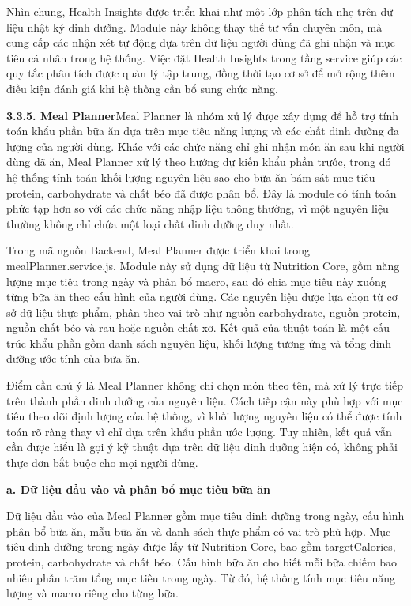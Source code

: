 Nhìn chung, Health Insights được triển khai như một lớp phân tích nhẹ trên dữ liệu nhật ký dinh dưỡng. Module này không thay thế tư vấn chuyên môn, mà cung cấp các nhận xét tự động dựa trên dữ liệu người dùng đã ghi nhận và mục tiêu cá nhân trong hệ thống. Việc đặt Health Insights trong tầng service giúp các quy tắc phân tích được quản lý tập trung, đồng thời tạo cơ sở để mở rộng thêm điều kiện đánh giá khi hệ thống cần bổ sung chức năng.

\textbf{3.3.5. Meal Planner}Meal Planner là nhóm xử lý được xây dựng để hỗ trợ tính toán khẩu phần bữa ăn dựa trên mục tiêu năng lượng và các chất dinh dưỡng đa lượng của người dùng. Khác với các chức năng chỉ ghi nhận món ăn sau khi người dùng đã ăn, Meal Planner xử lý theo hướng dự kiến khẩu phần trước, trong đó hệ thống tính toán khối lượng nguyên liệu sao cho bữa ăn bám sát mục tiêu protein, carbohydrate và chất béo đã được phân bổ. Đây là module có tính toán phức tạp hơn so với các chức năng nhập liệu thông thường, vì một nguyên liệu thường không chỉ chứa một loại chất dinh dưỡng duy nhất.

Trong mã nguồn Backend, Meal Planner được triển khai trong mealPlanner.service.js. Module này sử dụng dữ liệu từ Nutrition Core, gồm năng lượng mục tiêu trong ngày và phân bổ macro, sau đó chia mục tiêu này xuống từng bữa ăn theo cấu hình của người dùng. Các nguyên liệu được lựa chọn từ cơ sở dữ liệu thực phẩm, phân theo vai trò như nguồn carbohydrate, nguồn protein, nguồn chất béo và rau hoặc nguồn chất xơ. Kết quả của thuật toán là một cấu trúc khẩu phần gồm danh sách nguyên liệu, khối lượng tương ứng và tổng dinh dưỡng ước tính của bữa ăn.

Điểm cần chú ý là Meal Planner không chỉ chọn món theo tên, mà xử lý trực tiếp trên thành phần dinh dưỡng của nguyên liệu. Cách tiếp cận này phù hợp với mục tiêu theo dõi định lượng của hệ thống, vì khối lượng nguyên liệu có thể được tính toán rõ ràng thay vì chỉ dựa trên khẩu phần ước lượng. Tuy nhiên, kết quả vẫn cần được hiểu là gợi ý kỹ thuật dựa trên dữ liệu dinh dưỡng hiện có, không phải thực đơn bắt buộc cho mọi người dùng.

\textbf{a. Dữ liệu đầu vào và phân bổ mục tiêu bữa ăn}

Dữ liệu đầu vào của Meal Planner gồm mục tiêu dinh dưỡng trong ngày, cấu hình phân bổ bữa ăn, mẫu bữa ăn và danh sách thực phẩm có vai trò phù hợp. Mục tiêu dinh dưỡng trong ngày được lấy từ Nutrition Core, bao gồm targetCalories, protein, carbohydrate và chất béo. Cấu hình bữa ăn cho biết mỗi bữa chiếm bao nhiêu phần trăm tổng mục tiêu trong ngày. Từ đó, hệ thống tính mục tiêu năng lượng và macro riêng cho từng bữa.

